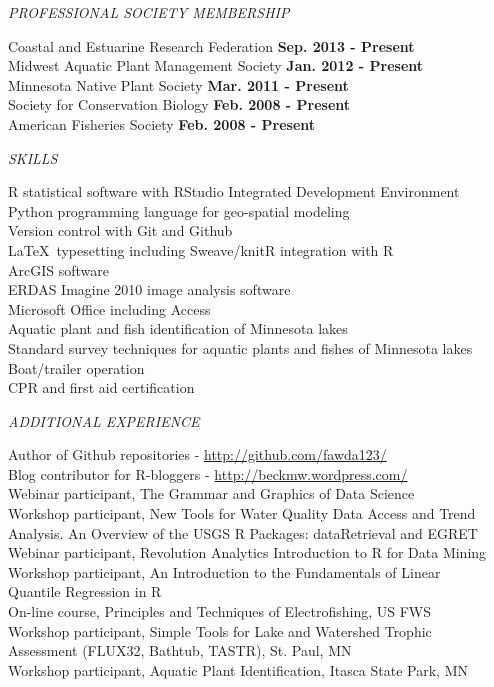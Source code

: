 \documentclass[letterpaper,12pt]{article}
\newcommand{\sectitle}[1]{\vspace{\baselineskip} \centerline{\large{\textit{#1}}}}
\begin{document}
\sectitle{PROFESSIONAL SOCIETY MEMBERSHIP}

Coastal and Estuarine Research Federation \hfill {\bf Sep. 2013 - Present} \\
Midwest Aquatic Plant Management Society \hfill {\bf Jan. 2012 - Present} \\
Minnesota Native Plant Society \hfill {\bf Mar. 2011 - Present} \\
Society for Conservation Biology \hfill {\bf Feb. 2008 - Present} \\
American Fisheries Society \hfill {\bf Feb. 2008 - Present}

\sectitle{SKILLS}

R statistical software with RStudio Integrated Development Environment \\
Python programming language for geo-spatial modeling \\
Version control with Git and Github \\
\LaTeX\ typesetting including Sweave/knitR integration with R \\
ArcGIS software\\
ERDAS Imagine 2010 image analysis software \\
Microsoft Office including Access \\
Aquatic plant and fish identification of Minnesota lakes \\
Standard survey techniques for aquatic plants and fishes of Minnesota lakes \\
Boat/trailer operation \\
CPR and first aid certification

\sectitle{ADDITIONAL EXPERIENCE}

Author of Github repositories - \url{http://github.com/fawda123/} \\
Blog contributor for R-bloggers - \url{http://beckmw.wordpress.com/} \\
Webinar participant, The Grammar and Graphics of Data Science \\
Workshop participant, New Tools for Water Quality Data Access and Trend \\ \hspace{0.3in} Analysis. An Overview of the USGS R Packages: dataRetrieval and EGRET\\
Webinar participant, Revolution Analytics Introduction to R for Data Mining \\
Workshop participant, An Introduction to the Fundamentals of Linear \\
\hspace{0.3in}Quantile Regression in R \\
On-line course, Principles and Techniques of Electrofishing, US FWS \\
Workshop participant, Simple Tools for Lake and Watershed Trophic \\
\hspace{0.3in}Assessment (FLUX32, Bathtub, TASTR), St. Paul, MN \\
Workshop participant, Aquatic Plant Identification, Itasca State Park, MN 
\end{document}
